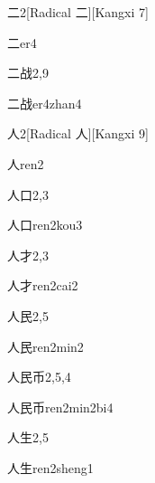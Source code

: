 \begin{entry}{二}{2}[Radical ⼆][Kangxi 7]
  \begin{phonetics}{二}{er4}
  \end{phonetics}
\end{entry}

\begin{entry}{二战}{2,9}
  \begin{phonetics}{二战}{er4zhan4}
  \end{phonetics}
\end{entry}

\begin{entry}{人}{2}[Radical 人][Kangxi 9]
  \begin{phonetics}{人}{ren2}
  \end{phonetics}
\end{entry}

\begin{entry}{人口}{2,3}
  \begin{phonetics}{人口}{ren2kou3}
  \end{phonetics}
\end{entry}

\begin{entry}{人才}{2,3}
  \begin{phonetics}{人才}{ren2cai2}
  \end{phonetics}
\end{entry}

\begin{entry}{人民}{2,5}
  \begin{phonetics}{人民}{ren2min2}
  \end{phonetics}
\end{entry}

\begin{entry}{人民币}{2,5,4}
  \begin{phonetics}{人民币}{ren2min2bi4}
  \end{phonetics}
\end{entry}

\begin{entry}{人生}{2,5}
  \begin{phonetics}{人生}{ren2sheng1}
  \end{phonetics}
\end{entry}

